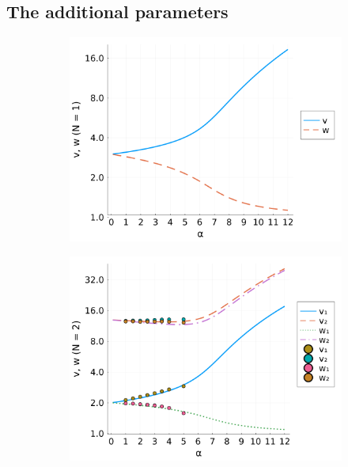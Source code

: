\subsection{The additional parameters}

\begin{figure}[!tbp]
    \centering
  \begin{subfigure}[b]{0.49\textwidth}
    \centering
    \includegraphics[width=\textwidth]{figures/vw_N1.png}
  \end{subfigure}
  \hfill
  \begin{subfigure}[b]{0.49\textwidth}
    \centering
    \includegraphics[width=\textwidth]{figures/vw_N2.png}
  \end{subfigure}

\end{figure}
